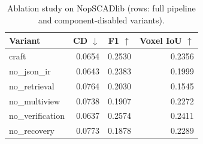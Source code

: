 \begin{table}[t]
\centering
\caption{Ablation study on NopSCADlib (rows: full pipeline and component-disabled variants).}
\label{tab:ablation}
\begin{tabular}{lrrr}
\toprule
Variant & CD $\downarrow$ & F1 $\uparrow$ & Voxel IoU $\uparrow$ \\
\midrule
craft & 0.0654 & 0.2530 & 0.2356 \\
no\_json\_ir & 0.0643 & 0.2383 & 0.1999 \\
no\_retrieval & 0.0764 & 0.2030 & 0.1545 \\
no\_multiview & 0.0738 & 0.1907 & 0.2272 \\
no\_verification & 0.0637 & 0.2574 & 0.2411 \\
no\_recovery & 0.0773 & 0.1878 & 0.2289 \\
\bottomrule
\end{tabular}
\end{table}
